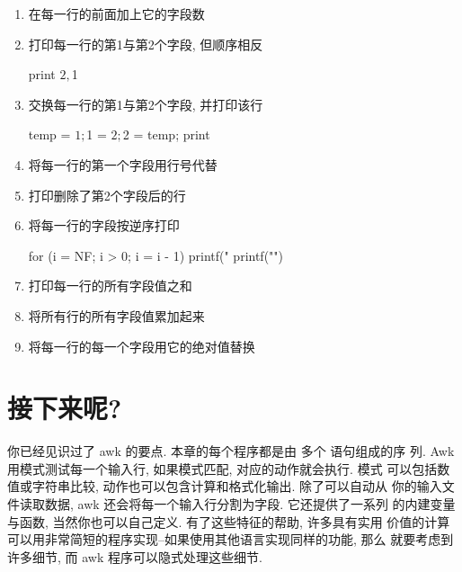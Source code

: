 \begin{enumerate}
\begin{myverb}
    $NF > 0
\end{myverb}
\item 打印长度超过80个字符的行
\begin{myverb}
    length($0) > 80
\end{myverb}
\item 在每一行的前面加上它的字段数
\item 打印每一行的第1与第2个字段, 但顺序相反
\begin{myverb}
    { print $2, $1 }
\end{myverb}
\item 交换每一行的第1与第2个字段, 并打印该行
\begin{myverb}
    { temp = $1; $1 = $2; $2 = temp; print }
\end{myverb}
\item 将每一行的第一个字段用行号代替
\item 打印删除了第2个字段后的行
\item 将每一行的字段按逆序打印
\begin{myverb}
    { for (i = NF; i > 0; i = i - 1) printf("%
      printf("\n")
    }
\end{myverb}
\item 打印每一行的所有字段值之和
\item 将所有行的所有字段值累加起来
\item 将每一行的每一个字段用它的绝对值替换
\end{enumerate}

\section{接下来呢?}
\label{sec:what_next}
你已经见识过了 awk 的要点. 本章的每个程序都是由
多个 \patact 语句组成的序
列. Awk 用模式测试每一个输入行, 如果模式匹配, 对应的动作就会执行. 模式
可以包括数值或字符串比较, 动作也可以包含计算和格式化输出. 除了可以自动从
你的输入文件读取数据, awk 还会将每一个输入行分割为字段. 它还提供了一系列
的内建变量与函数, 当然你也可以自己定义. 有了这些特征的帮助, 许多具有实用
价值的计算可以用非常简短的程序实现--如果使用其他语言实现同样的功能, 那么
就要考虑到许多细节, 而 awk 程序可以隐式处理这些细节.

